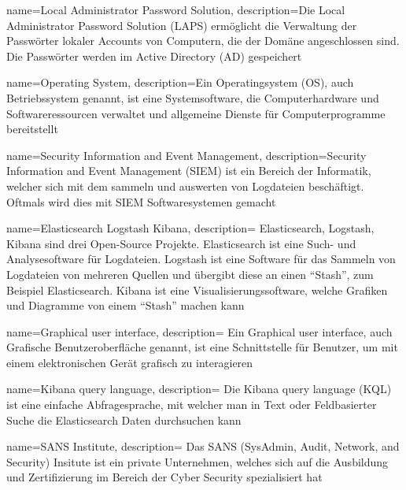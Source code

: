 {
    name=Local Administrator Password Solution,
    description={Die Local Administrator Password Solution (LAPS) ermöglicht die Verwaltung der Passwörter lokaler Accounts von Computern, die der Domäne angeschlossen sind. Die Passwörter werden im Active Directory (AD) gespeichert}
}

{
    name=Operating System,
    description={Ein Operatingsystem (OS), auch Betriebssystem genannt, ist eine Systemsoftware, die Computerhardware und Softwareressourcen verwaltet und allgemeine Dienste für Computerprogramme bereitstellt}
}

{
    name=Security Information and Event Management,
    description={Security Information and Event Management (SIEM) ist ein Bereich der Informatik, welcher sich mit dem sammeln und auswerten von Logdateien beschäftigt.
    Oftmals wird dies mit SIEM Softwaresystemen gemacht}
}

{
    name=Elasticsearch Logstash Kibana,
    description={
        Elasticsearch, Logstash, Kibana sind drei Open-Source Projekte. Elasticsearch ist eine Such- und Analysesoftware für Logdateien.
        Logstash ist eine Software für das Sammeln von Logdateien von mehreren Quellen und übergibt diese an einen ``Stash'', zum Beispiel Elasticsearch.
        Kibana ist eine Visualisierungssoftware, welche Grafiken und Diagramme von einem ``Stash'' machen kann
    }
}

{
    name=Graphical user interface,
    description={
        Ein Graphical user interface, auch Grafische Benutzeroberfläche genannt, ist eine Schnittstelle für Benutzer, um mit einem elektronischen Gerät grafisch zu interagieren
    }
}

{
    name=Kibana query language,
    description={
        Die Kibana query language (KQL) ist eine einfache Abfragesprache, mit welcher man in Text oder Feldbasierter Suche die Elasticsearch Daten durchsuchen kann
    }
}

{
    name=SANS Institute,
    description={
        Das SANS (SysAdmin, Audit, Network, and Security) Insitute ist ein private Unternehmen, welches sich auf die Ausbildung und Zertifizierung im Bereich der Cyber Security spezialisiert hat
    }
}
